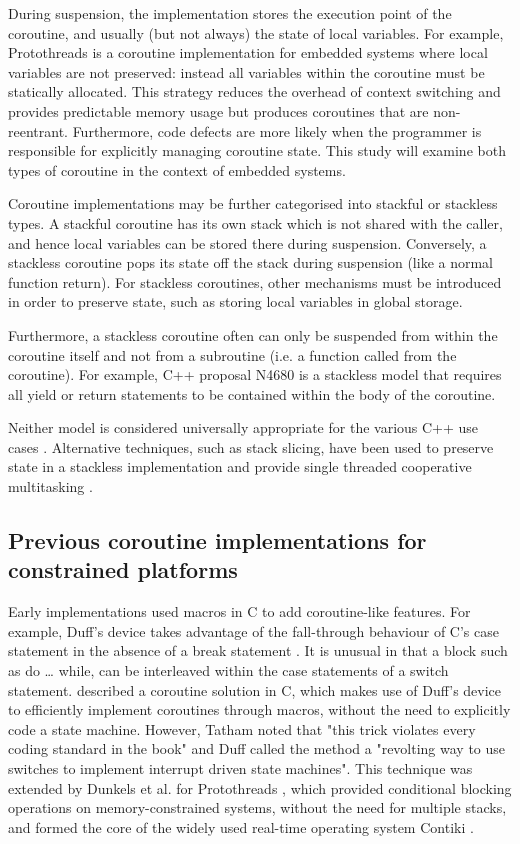 During suspension, the implementation stores the execution point of the coroutine, and usually (but not always) the state of local variables. For example, Protothreads \cite{Dunkels2006} is a coroutine implementation for embedded systems where local variables are not preserved: instead all variables within the coroutine must be statically allocated. This strategy reduces the overhead of context switching and provides predictable memory usage but produces coroutines that are non-reentrant. Furthermore, code defects are more likely when the programmer is responsible for explicitly managing coroutine state. This study will examine both types of coroutine in the context of embedded systems.

Coroutine implementations may be further categorised into stackful or stackless types. A stackful coroutine has its own stack which is not shared with the caller, and hence local variables can be stored there during suspension. Conversely, a stackless coroutine pops its state off the stack during suspension (like a normal function return). For stackless coroutines, other mechanisms must be introduced in order to preserve state, such as storing local variables in global storage. 

Furthermore, a stackless coroutine often can only be suspended from within the coroutine itself and not from a subroutine (i.e. a function called from the coroutine). For example, C++ proposal N4680 is a stackless model that requires all yield or return statements to be contained within the body of the coroutine.

Neither model is considered universally appropriate for the various C++ use cases \cite{Goodspeed2014, Riegel2015}. Alternative techniques, such as stack slicing, have been used to preserve state in a stackless implementation and provide single threaded cooperative multitasking \cite{Tismer2000, Tismer2018}.

\subsection{Previous coroutine implementations for constrained platforms}
\label{previous-implementations}

Early implementations used macros in C to add coroutine-like features. For example, Duff's device takes advantage of the fall-through behaviour of C's case statement in the absence of a break statement \cite{Duff88}. It is unusual in that a block such as do … while, can be interleaved within the case statements of a switch statement.  described a coroutine solution in C, which makes use of Duff's device to efficiently implement coroutines through macros, without the need to explicitly code a state machine. However, Tatham noted that "this trick violates every coding standard in the book" and Duff called the method a "revolting way to use switches to implement interrupt driven state machines". This technique was extended by Dunkels et al. for Protothreads \cite{Dunkels2006}, which provided conditional blocking operations on memory-constrained systems, without the need for multiple stacks, and formed the core of the widely used real-time operating system Contiki \cite{Dunkels2004}.

